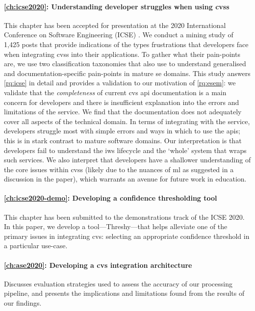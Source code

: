 \paragraph{\cref{ch:icse2020}: Understanding developer struggles when using \glspl{cvs}} This chapter has been accepted for presentation at the 2020 International Conference on Software Engineering (ICSE) \citep{Cummaudo:2019vi}. We conduct a mining study of 1,425  posts that provide indications of the types frustrations that developers face when integrating \glspl{cvs} into their applications. To gather what their pain-points are, we use two classification taxonomies that also use  to understand generalised and documentation-specific pain-points in mature \gls{se} domains. This study answers \ref{rq:icse} in detail and provides a validation to our motivation of \ref{rq:esem}: we validate that the \textit{completeness} of current \gls{cvs} \gls{api} documentation is a main concern for developers and there is insufficient explanation into the errors and limitations of the service. We find that the documentation does not adequately cover all aspects of the technical domain. In terms of integrating with the service, developers struggle most with simple errors and ways in which to use the \glspl{api}; this is in stark contrast to mature software domains. Our interpretation is that developers fail to understand the \gls{iws} lifecycle and the `whole' system that wraps such services. We also interpret that developers have a shallower understanding of the core issues within \glspl{cvs} (likely due to the nuances of \gls{ml} as suggested in a discussion in the paper), which warrants an avenue for future work in  education.

\paragraph{\cref{ch:icse2020-demo}: Developing a confidence thresholding tool} This chapter has been submitted to the demonstrations track of the ICSE 2020. In this paper, we develop a tool---Threshy---that helps alleviate one of the primary issues in integrating \gls{cvs}: selecting an appropriate confidence threshold in a particular use-case. 

\paragraph{\cref{ch:ase2020}: Developing a \gls{cvs} integration architecture} Discusses evaluation strategies used to assess the accuracy of our processing pipeline, and presents the implications and limitations found from the results of our findings.

